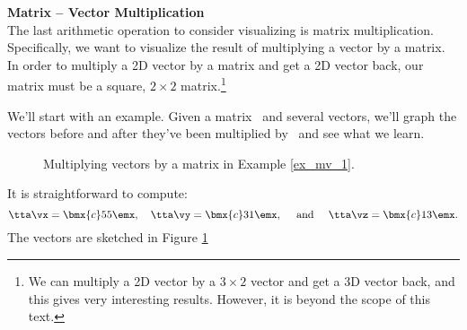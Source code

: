 \noindent \large \textsf{\textbf{Matrix -- Vector Multiplication}} \normalsize\\

The last arithmetic operation to consider visualizing is matrix multiplication. Specifically, we want to visualize the result of multiplying a vector by a matrix. In order to multiply a 2D vector by a matrix and get a 2D vector back, our matrix must be a square, $2\times 2$ matrix.\footnote{We can multiply a 2D vector by a $3\times 2$ vector and get a 3D vector back, and this gives very interesting results. However, it is beyond the scope of this text.}

We'll start with an example. Given a matrix \tta\ and several vectors, we'll graph the vectors before and after they've been multiplied by \tta\ and see what we learn.\\

{\begin{figure}[h!]
\begin{center}
\end{center}
\caption{Multiplying vectors by a matrix in Example \ref{ex_mv_1}.}
\label{fig:mv_1}
\end{figure}

It is straightforward to compute: $$\tta\vx = \bmx{c} 5\\5\emx,\quad \tta\vy = \bmx{c} 3\\1\emx, \quad \text{ and } \quad \tta\vz = \bmx{c} 1\\3\emx.$$ The vectors are sketched in Figure \ref{fig:mv_1}
}%

